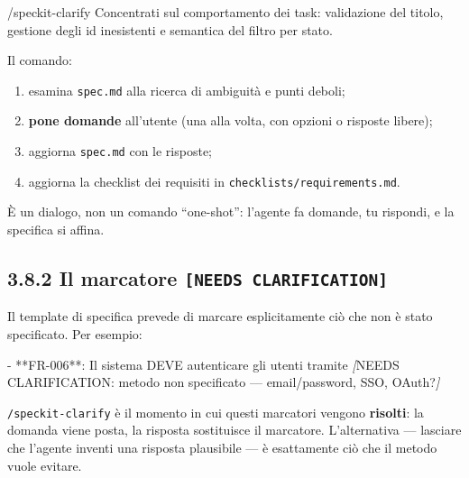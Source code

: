 \documentclass[
  italian,
  10pt,
]{book}
\newenvironment{Shaded}{\begin{snugshade}}{\end{snugshade}}
\newcommand{\CommentTok}[1]{\textcolor[rgb]{0.56,0.35,0.01}{\textit{#1}}}
\newcommand{\NormalTok}[1]{#1}
\newcommand{\OtherTok}[1]{\textcolor[rgb]{0.56,0.35,0.01}{#1}}
\newcommand{\SpecialStringTok}[1]{\textcolor[rgb]{0.31,0.60,0.02}{#1}}
\providecommand{\tightlist}{%
  \setlength{\itemsep}{0pt}\setlength{\parskip}{0pt}}
\begin{document}
\begin{Shaded}
\begin{Highlighting}[]
\NormalTok{/speckit{-}clarify Concentrati sul comportamento dei task: validazione del titolo,}
\NormalTok{gestione degli id inesistenti e semantica del filtro per stato.}
\end{Highlighting}
\end{Shaded}

Il comando:

\begin{enumerate}
\def\labelenumi{\arabic{enumi}.}
\tightlist
\item
  esamina \texttt{spec.md} alla ricerca di ambiguità e punti deboli;
\item
  \textbf{pone domande} all'utente (una alla volta, con opzioni o
  risposte libere);
\item
  aggiorna \texttt{spec.md} con le risposte;
\item
  aggiorna la checklist dei requisiti in
  \texttt{checklists/requirements.md}.
\end{enumerate}

È un dialogo, non un comando ``one-shot'': l'agente fa domande, tu
rispondi, e la specifica si affina.

\subsection{\texorpdfstring{3.8.2 Il marcatore
\texttt{{[}NEEDS\ CLARIFICATION{]}}}{3.8.2 Il marcatore {[}NEEDS CLARIFICATION{]}}}\label{il-marcatore-needs-clarification}

Il template di specifica prevede di marcare esplicitamente ciò che non è
stato specificato. Per esempio:

\begin{Shaded}
\begin{Highlighting}[]
\SpecialStringTok{{-} }\NormalTok{**FR{-}006**: Il sistema DEVE autenticare gli utenti tramite}
  \CommentTok{[}\OtherTok{NEEDS CLARIFICATION: metodo non specificato — email/password, SSO, OAuth?}\CommentTok{]}
\end{Highlighting}
\end{Shaded}

\texttt{/speckit-clarify} è il momento in cui questi marcatori vengono
\textbf{risolti}: la domanda viene posta, la risposta sostituisce il
marcatore. L'alternativa --- lasciare che l'agente inventi una risposta
plausibile --- è esattamente ciò che il metodo vuole evitare.
\end{document}
